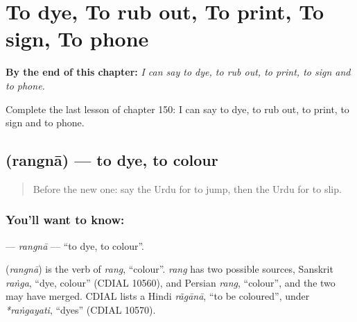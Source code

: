 
\chapter{To dye, To rub out, To print, To sign, To phone}
\label{ch:ur-to-dye-to-rub-out-to-print-to-sign-to-phone}

\begin{chapteropening}
\textbf{By the end of this chapter:} \emph{I can say to dye, to rub out, to print, to sign and to phone.}

Complete the last lesson of chapter 150: I can say to dye, to rub out, to print, to sign and to phone.
\end{chapteropening}

\section[\texorpdfstring{\ur{رنگنا} (rangnā)}{رنگنا (rangnā)}]{ (rangnā) — to dye, to colour}

\label{lesson:UR-C150-rangna}



\begin{quote}
Before the new one: say the Urdu for to jump, then the Urdu for to slip.
\end{quote}

\subsection*{You'll want to know: }
\textbf{} — \emph{rangnā} — \textquotedblleft{}to dye, to colour\textquotedblright{}.

\begin{cousinweb}
\textbf{} (\emph{rangnā}) is the verb of \emph{rang}, \textquotedblleft{}colour\textquotedblright{}. \emph{rang} has two possible sources, Sanskrit \emph{raṅga}, \textquotedblleft{}dye, colour\textquotedblright{} (CDIAL 10560), and Persian \emph{rang}, \textquotedblleft{}colour\textquotedblright{}, and the two may have merged. CDIAL lists a Hindi \emph{rãgānā}, \textquotedblleft{}to be coloured\textquotedblright{}, under \emph{*raṅgayati}, \textquotedblleft{}dyes\textquotedblright{} (CDIAL 10570).
\end{cousinweb}

